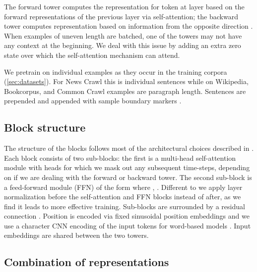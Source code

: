 \documentclass[11pt,a4paper]{article}
\begin{document}
The forward tower computes the representation  for token  at layer  based on the forward representations of the previous layer  via self-attention; the backward tower computes representation  based on information from the opposite direction .
When examples of uneven length are batched, one of the towers may not have any context at the beginning. 
We deal with this issue by adding an extra zero state over which the self-attention mechanism can attend.

We pretrain on individual examples as they occur in the training corpora (\textsection\ref{sec:datasets}).
For News Crawl this is individual sentences while on Wikipedia, Bookcorpus, and Common Crawl examples are paragraph length.
Sentences are prepended and appended with sample boundary markers .



\subsection{Block structure}
\label{sec:block}
The structure of the blocks follows most of the architectural choices described in \citet{vaswani2017transformer}.
Each block consists of two sub-blocks: the first is a multi-head self-attention module with  heads for which we mask out any subsequent time-steps, depending on if we are dealing with the forward or backward tower.
The second sub-block is a feed-forward module (FFN) of the form  where , .
Different to \citet{vaswani2017transformer} we apply layer normalization before the self-attention and FFN blocks instead of after, as we find it leads to more effective training.
Sub-blocks are surrounded by a residual connection \citep{he2015deep}.
Position is encoded via fixed sinusoidal position embeddings and we use a character CNN encoding of the input tokens for word-based models \citep{kim2016character}.
Input embeddings are shared between the two towers.

\subsection{Combination of representations}
\end{document}
